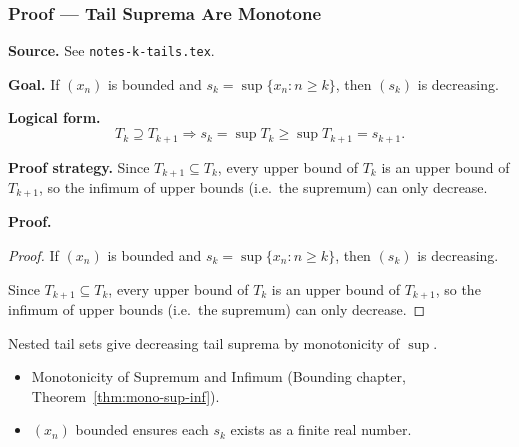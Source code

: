 
\clearpage
{}
\hypertarget{proof-RA-ABB-T-tail-sup-monotone}{}

\subsubsection[Tail Suprema Are Monotone]{Proof --- Tail Suprema Are Monotone}

\bigskip

\noindent
\textbf{Source.}
See \texttt{notes-k-tails.tex}.

\vspace{0.75em}

\noindent
\textbf{Goal.}
If $(x_n)$ is bounded and $s_k = \sup\{x_n : n \ge k\}$, then $(s_k)$ is decreasing.

\vspace{0.75em}

\noindent
\textbf{Logical form.}
\[
  T_k \supseteq T_{k+1} \Rightarrow s_k = \sup T_k \ge \sup T_{k+1} = s_{k+1}.
\]

\vspace{0.75em}

\noindent
\textbf{Proof strategy.}
Since $T_{k+1} \subseteq T_k$, every upper bound of $T_k$ is an upper bound of $T_{k+1}$, so the infimum of upper bounds (i.e.\ the supremum) can only decrease.

\vspace{0.75em}

\noindent
\textbf{Proof.}
\begin{proof}
\Claim If $(x_n)$ is bounded and $s_k = \sup\{x_n : n \ge k\}$, then $(s_k)$ is decreasing.

\Given 

\Goal 

\Strategy Since $T_{k+1} \subseteq T_k$, every upper bound of $T_k$ is an upper bound of $T_{k+1}$, so the infimum of upper bounds (i.e.\ the supremum) can only decrease.

\medskip


\end{proof}

\begin{remark*}
Nested tail sets give decreasing tail suprema by monotonicity of $\sup$.
\end{remark*}

\begin{remark*}[Dependencies]
\begin{itemize}
  \item Monotonicity of Supremum and Infimum (Bounding chapter, Theorem~\ref{thm:mono-sup-inf}).
  \item $(x_n)$ bounded ensures each $s_k$ exists as a finite real number.
\end{itemize}
\end{remark*}
